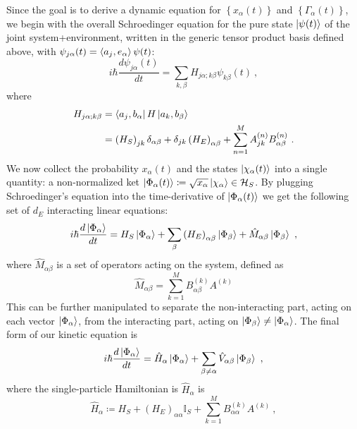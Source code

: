 \documentclass[draft,nofootinbib,pre,twocolumn,showpacs,showkeys,preprintnumbers,floatfix]{revtex4-1}
\newcommand{\1}{\mathbbm{1}}
\begin{document}
Since the goal is to derive a dynamic equation for $\left\{x_\alpha(t) \right\}$ and $\left\{\Gamma_\alpha(t)\right\}$,
we begin with the overall Schroedinger equation for the pure state $\ket{\psi(t)}$ of the joint system+environment, written
in the generic tensor product basis defined above, with $\psi_{j\alpha}(t) = \braket{a_j,e_\alpha}{\psi(t)}$:
\begin{equation}
i\hbar \frac{d \psi_{j\alpha}(t)}{dt} = \sum_{k,\beta} H_{j\alpha;k\beta} \psi_{k\beta}(t)~,
\end{equation}
where
\begin{align}
H_{j\alpha;k\beta} &= \bra{a_j,b_\alpha} H \ket{a_k,b_\beta}\\
&= \left(H_S\right)_{jk}\delta_{\alpha \beta} + \delta_{jk} \left(H_E\right)_{\alpha \beta} + \sum_{n=1}^M A_{jk}^{(n)} B^{(n)}_{\alpha \beta}~.\nonumber 
\end{align}
We now collect the probability $x_\alpha(t)$ and the states $\ket{\chi_\alpha(t)}$ into
a single quantity: a non-normalized ket $\ket{\Phi_\alpha(t)} \coloneqq \sqrt{x_\alpha}\ket{\chi_\alpha} \in \mathcal{H}_S$.
By plugging Schroedinger's equation into the time-derivative of $\ket{\Phi_\alpha(t)}$ we get the following set of $d_E$
interacting linear equations:
\begin{equation}
i\hbar \frac{d \ket{\Phi_\alpha}}{dt} = H_S \ket{\Phi_\alpha} + \sum_{\beta} \left( H_E\right)_{\alpha\beta}\ket{\Phi_\beta} + \hat{M}_{\alpha \beta}\ket{\Phi_\beta}~,
\end{equation}
where $\hat{M}_{\alpha\beta}$ is a set of operators acting on the system, defined as 
\begin{equation}
\hat{M}_{\alpha \beta} = \sum_{k=1}^M B^{(k)}_{\alpha\beta} A^{(k)}
\end{equation}
This can be further manipulated to separate the non-interacting part, acting on each vector $\ket{\Phi_\alpha}$, 
from the interacting part, acting on $\ket{\Phi_\beta}\neq \ket{\Phi_\alpha}$. The final form of our kinetic equation is
\begin{equation}
i\hbar \frac{d \ket{\Phi_\alpha}}{dt} = \hat{H}_\alpha \ket{\Phi_\alpha} + \sum_{\beta \neq \alpha} \hat{V}_{\alpha \beta}\ket{\Phi_\beta}~,\label{eq:kinetic}
\end{equation}
where the single-particle Hamiltonian is $\hat{H}_\alpha$ is
\begin{equation}
\hat{H}_\alpha \coloneqq H_S + \left( H_E\right)_{\alpha \alpha} \mathbb{I}_S + \sum_{k=1}^M B^{(k)}_{\alpha \alpha}A^{(k)}~,\label{ed:def_Halpha}
\end{equation}
\end{document}

